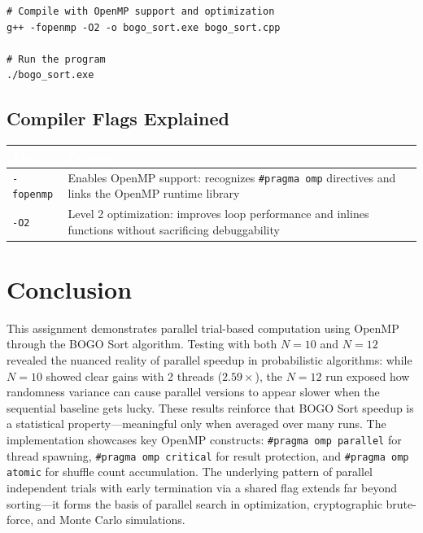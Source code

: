 \documentclass[11pt]{article}
\begin{document}
\begin{codebox}
\begin{lstlisting}[style=bashstyle]
# Compile with OpenMP support and optimization
g++ -fopenmp -O2 -o bogo_sort.exe bogo_sort.cpp

# Run the program
./bogo_sort.exe
\end{lstlisting}
\end{codebox}

\subsection{Compiler Flags Explained}

\begin{center}
\sffamily\small
\begin{tabular}{@{}lp{10cm}@{}}
\toprule
\rowcolor{tableheader}
\textcolor{white}{\textbf{Flag}} & \textcolor{white}{\textbf{Purpose}} \\
\midrule
\rowcolor{rowalt}
\texttt{-fopenmp} & Enables OpenMP support: recognizes \texttt{\#pragma omp} directives and links the OpenMP runtime library \\
\texttt{-O2} & Level 2 optimization: improves loop performance and inlines functions without sacrificing debuggability \\
\bottomrule
\end{tabular}
\end{center}

\section{Conclusion}

This assignment demonstrates parallel trial-based computation using OpenMP through the BOGO Sort algorithm. Testing with both $N = 10$ and $N = 12$ revealed the nuanced reality of parallel speedup in probabilistic algorithms: while $N = 10$ showed clear gains with 2 threads ($2.59\times$), the $N = 12$ run exposed how randomness variance can cause parallel versions to appear slower when the sequential baseline gets lucky. These results reinforce that BOGO Sort speedup is a statistical property---meaningful only when averaged over many runs. The implementation showcases key OpenMP constructs: \texttt{\#pragma omp parallel} for thread spawning, \texttt{\#pragma omp critical} for result protection, and \texttt{\#pragma omp atomic} for shuffle count accumulation. The underlying pattern of parallel independent trials with early termination via a shared flag extends far beyond sorting---it forms the basis of parallel search in optimization, cryptographic brute-force, and Monte Carlo simulations.
\end{document}
